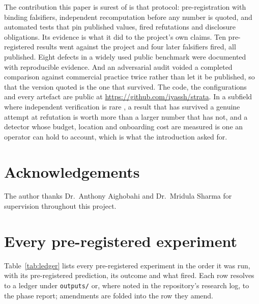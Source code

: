 \documentclass[11pt,letterpaper]{article}
\begin{document}
The contribution this paper is surest of is that protocol: pre-registration with binding falsifiers, independent recomputation before any number is quoted, and automated tests that pin published values, fired refutations and disclosure obligations. Its evidence is what it did to the project's own claims. Ten pre-registered results went against the project and four later falsifiers fired, all published. Eight defects in a widely used public benchmark were documented with reproducible evidence. And an adversarial audit voided a completed comparison against commercial practice twice rather than let it be published, so that the version quoted is the one that survived. The code, the configurations and every artefact are public at \url{https://github.com/iyassh/strata}. In a subfield where independent verification is rare \cite{mukhtar2025reproducibility}, a result that has survived a genuine attempt at refutation is worth more than a larger number that has not, and a detector whose budget, location and onboarding cost are measured is one an operator can hold to account, which is what the introduction asked for.

\section*{Acknowledgements}

The author thanks Dr.\ Anthony Aighobahi and Dr.\ Mridula Sharma for supervision throughout this project.

\appendix
\section{Every pre-registered experiment}
\label{app:ledger}

Table~\ref{tab:ledger} lists every pre-registered experiment in the order it was run, with its pre-registered prediction, its outcome and what fired. Each row resolves to a ledger under \texttt{outputs/} or, where noted in the repository's research log, to the phase report; amendments are folded into the row they amend.
\end{document}
